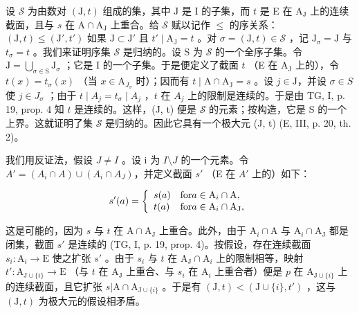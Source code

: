 设 \(\mathcal{S}\) 为由数对 \((\mathrm{J},t)\) 组成的集，其中 \(\mathrm{J}\) 是 I 的子集，而 \(t\) 是 E 在 \(\mathrm{A_J}\) 上的连续截面，且与 \(s\) 在 \(\mathrm{A} \cap \mathrm{A_J}\) 上重合。给 \(\mathcal{S}\) 赋以记作 \(\leqslant\) 的序关系：\((\mathrm{J},t) \leqslant (\mathrm{J}',t')\) 如果 \(\mathrm{J} \subset \mathrm{J}'\) 且 \(t' \mid \mathrm{A_J} = t\) 。对 \(\sigma = (\mathrm{J},t) \in \mathcal{S}\) ，记 \(\mathrm{J}_{\sigma} = \mathrm{J}\) 与 \(t_{\sigma} = t\) 。我们来证明序集 \(\mathcal{S}\) 是归纳的。设 S 为 \(\mathcal{S}\) 的一个全序子集。令 \(\mathrm{J} = \bigcup_{\sigma \in \mathrm{S}} \mathrm{J}_{\sigma}\) ；它是 I 的一个子集。于是便定义了截面 \(t\) （E 在 \(\mathrm{A_J}\) 上的），令 \(t(x) = t_{\sigma}(x)\) （当 \(x \in \mathrm{A}_{J_{\sigma}}\) 时）；因而有 \(t \mid \mathrm{A} \cap \mathrm{A_J} = s\) 。设 \(j \in \mathrm{J}\)，并设 \(\sigma \in S\) 使 \(j \in J_{\sigma}\) ；由于 \(t \mid A_j = t_{\sigma} \mid A_j\) ，\(t\) 在 \(A_j\) 上的限制是连续的。于是由 TG, I, p. 19, prop. 4 知 \(t\) 是连续的。这样，(J, t) 便是 \(\mathcal{S}\) 的元素；按构造，它是 S 的一个上界。这就证明了集 \(\mathcal{S}\) 是归纳的。因此它具有一个极大元 (J, t) (E, III, p. 20, th. 2)。

我们用反证法，假设 \(J \neq I\) 。设 i 为 \(I \setminus J\) 的一个元素。令 \(A' = (A_i \cap A) \cup (A_i \cap A_J)\)，并定义截面 \(s'\) （E 在 \(A'\) 上的）如下：

\[
s ^ {\prime} (a) = \left\{ \begin{array}{l l} s (a) & \text {for} a \in \mathrm{A} _ {i} \cap \mathrm{A}, \\ t (a) & \text {for} a \in \mathrm{A} _ {i} \cap \mathrm{A} _ {\mathrm{J}}, \end{array} \right.
\]

这是可能的，因为 \(s\) 与 \(t\) 在 \(\mathrm{A} \cap \mathrm{A}_{\mathrm{J}}\) 上重合。此外，由于 \(\mathrm{A}_{i} \cap \mathrm{A}\) 与 \(\mathrm{A}_{i} \cap \mathrm{A}_{\mathrm{J}}\) 都是闭集，截面 \(s'\) 是连续的 (TG, I, p. 19, prop. 4)。按假设，存在连续截面 \(s_{i}: \mathrm{A}_{i} \to \mathrm{E}\) 使之扩张 \(s'\) 。由于 \(s_{i}\) 与 \(t\) 在 \(\mathrm{A}_{\mathrm{J}} \cap \mathrm{A}_{i}\) 上的限制相等，映射 \(t': \mathrm{A}_{\mathrm{J} \cup \{i\}} \to \mathrm{E}\) （与 \(t\) 在 \(\mathrm{A}_{\mathrm{J}}\) 上重合、与 \(s_{i}\) 在 \(\mathrm{A}_{i}\) 上重合者）便是 \(p\) 在 \(\mathrm{A}_{\mathrm{J} \cup \{i\}}\) 上的连续截面，且它扩张 \(s| \mathrm{A} \cap \mathrm{A}_{\mathrm{J} \cup \{i\}}\) 。于是有 \((\mathrm{J}, t) < (\mathrm{J} \cup \{i\}, t')\) ，这与 \((\mathrm{J}, t)\) 为极大元的假设相矛盾。

